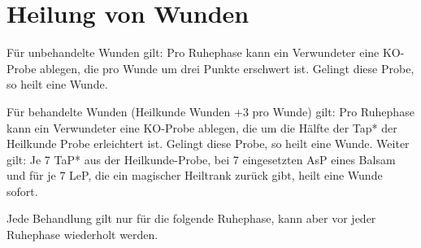 \section{Heilung von Wunden}
Für unbehandelte Wunden gilt: Pro Ruhephase kann ein Verwundeter eine KO-Probe ablegen, die pro Wunde um drei Punkte erschwert ist.
Gelingt diese Probe, so heilt eine Wunde.

Für behandelte Wunden (Heilkunde Wunden +3 pro Wunde) gilt: Pro Ruhephase kann ein Verwundeter eine KO-Probe ablegen, die um die Hälfte der Tap* der Heilkunde Probe erleichtert ist.
Gelingt diese Probe, so heilt eine Wunde.
Weiter gilt: Je 7 TaP* aus der Heilkunde-Probe, bei 7 eingesetzten AsP eines Balsam und für je 7 LeP, die ein magischer Heiltrank zurück gibt, heilt eine Wunde sofort.

Jede Behandlung gilt nur für die folgende Ruhephase, kann aber vor jeder Ruhephase wiederholt werden.
